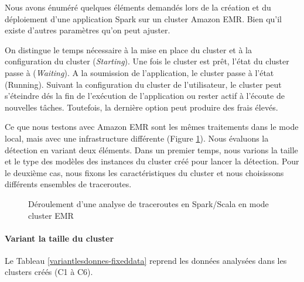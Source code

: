 Nous avons énuméré quelques éléments demandés lors de la création et du déploiement d'une application Spark sur un cluster Amazon EMR. Bien  qu'il existe d'autres paramètres qu'on peut ajuster. 

On distingue le temps nécessaire à la mise en place du cluster et à la configuration du cluster (\textit{Starting}). Une fois le cluster est prêt, l'état du cluster passe à (\textit{Waiting}).  A la soumission de l'application, le cluster passe à l'état (Running). Suivant la configuration du cluster de l'utilisateur, le cluster peut s'éteindre dés la fin de l'exécution de l'application ou rester actif à l'écoute de nouvelles tâches. Toutefois, la dernière option peut produire des frais élevés.  


Ce que nous testons avec Amazon EMR sont les mêmes traitements dans le mode local, mais avec une infrastructure différente (Figure \ref{fig:sparktimingEMR}). Nous évaluons la détection en variant deux éléments. Dans un premier temps, nous varions la taille et le type des modèles des instances du cluster créé pour lancer la détection. Pour le deuxième cas, nous fixons les caractéristiques du cluster et  nous choisissons différents ensembles de traceroutes. 


\begin{figure}[H]
	\centering
	\captionsetup{justification=centering}
	\resizebox{\textwidth}{!}{
		
	}
	\caption{Déroulement d'une analyse de  traceroutes en Spark/Scala en mode cluster EMR}
	\label{fig:sparktimingEMR}
\end{figure}


\paragraph{Variant la taille du cluster}

Le Tableau 	\ref{variantlesdonnes-fixeddata} reprend les données analysées dans les clusters créés (C1 à C6).

\begin{table}[H]
	\centering
	\caption{Les données analysées dans les clusters C1 à C6 }
	\label{variantlesdonnes-fixeddata}
\end{table}

